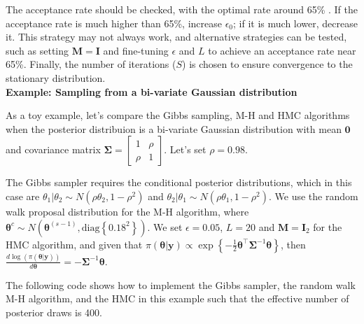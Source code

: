 The acceptance rate should be checked, with the optimal rate around 65\% \cite[Chap.~12]{gelman2021bayesian}. If the acceptance rate is much higher than 65\%, increase \(\epsilon_0\); if it is much lower, decrease it. This strategy may not always work, and alternative strategies can be tested, such as setting \(\bm{M} = \bm{I}\) and fine-tuning \(\epsilon\) and \(L\) to achieve an acceptance rate near 65\%. Finally, the number of iterations (\(S\)) is chosen to ensure convergence to the stationary distribution.\\

\textbf{Example: Sampling from a bi-variate Gaussian distribution}

As a toy example, let's compare the Gibbs sampling, M-H and HMC algorithms when the posterior distribuion is a bi-variate Gaussian distribution with mean $\bm{0}$ and covariance matrix $\bm{\Sigma}=\begin{bmatrix}
	1 & \rho \\
	\rho & 1
\end{bmatrix}$. Let's set $\rho= 0.98$.

The Gibbs sampler requires the conditional posterior distributions, which in this case are $\theta_1|\theta_2\sim N(\rho\theta_2,1-\rho^2)$ and $\theta_2|\theta_1\sim N(\rho\theta_1,1-\rho^2)$. We use the random walk proposal distribution for the M-H algorithm, where $\bm{\theta}^c\sim N(\bm{\theta}^{(s-1)}, \text{diag}\left\{0.18^2\right\})$. We set $\epsilon=0.05$, $L=20$ and $\bm{M}=\bm{I}_2$ for the HMC algorithm, and given that $\pi(\bm{\theta}|\bm{y})\propto \exp\left\{-\frac{1}{2}\bm{\theta}^{\top}\bm{\Sigma}^{-1}\bm{\theta}\right\}$, then $\frac{d\log(\pi(\bm{\theta}|\bm{y}))}{d\bm{\theta}}=-\bm{\Sigma}^{-1}\bm{\theta}$.

The following code shows how to implement the Gibbs sampler, the random walk M-H algorithm, and the HMC in this example such that the effective number of posterior draws is 400.

